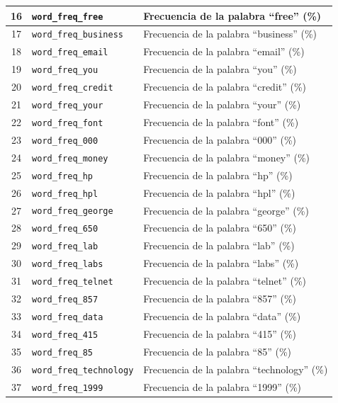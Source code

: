 \documentclass[a4paper,11pt ,openany]{book}
\begin{document}
\begin{longtable}{|c|l|l|}
16 & \texttt{word\_freq\_free} & Frecuencia de la palabra ``free'' (\%) \\ \hline
17 & \texttt{word\_freq\_business} & Frecuencia de la palabra ``business'' (\%) \\ \hline
18 & \texttt{word\_freq\_email} & Frecuencia de la palabra ``email'' (\%) \\ \hline
19 & \texttt{word\_freq\_you} & Frecuencia de la palabra ``you'' (\%) \\ \hline
20 & \texttt{word\_freq\_credit} & Frecuencia de la palabra ``credit'' (\%) \\ \hline
21 & \texttt{word\_freq\_your} & Frecuencia de la palabra ``your'' (\%) \\ \hline
22 & \texttt{word\_freq\_font} & Frecuencia de la palabra ``font'' (\%) \\ \hline
23 & \texttt{word\_freq\_000} & Frecuencia de la palabra ``000'' (\%) \\ \hline
24 & \texttt{word\_freq\_money} & Frecuencia de la palabra ``money'' (\%) \\ \hline
25 & \texttt{word\_freq\_hp} & Frecuencia de la palabra ``hp'' (\%) \\ \hline
26 & \texttt{word\_freq\_hpl} & Frecuencia de la palabra ``hpl'' (\%) \\ \hline
27 & \texttt{word\_freq\_george} & Frecuencia de la palabra ``george'' (\%) \\ \hline
28 & \texttt{word\_freq\_650} & Frecuencia de la palabra ``650'' (\%) \\ \hline
29 & \texttt{word\_freq\_lab} & Frecuencia de la palabra ``lab'' (\%) \\ \hline
30 & \texttt{word\_freq\_labs} & Frecuencia de la palabra ``labs'' (\%) \\ \hline
31 & \texttt{word\_freq\_telnet} & Frecuencia de la palabra ``telnet'' (\%) \\ \hline
32 & \texttt{word\_freq\_857} & Frecuencia de la palabra ``857'' (\%) \\ \hline
33 & \texttt{word\_freq\_data} & Frecuencia de la palabra ``data'' (\%) \\ \hline
34 & \texttt{word\_freq\_415} & Frecuencia de la palabra ``415'' (\%) \\ \hline
35 & \texttt{word\_freq\_85} & Frecuencia de la palabra ``85'' (\%) \\ \hline
36 & \texttt{word\_freq\_technology} & Frecuencia de la palabra ``technology'' (\%) \\ \hline
37 & \texttt{word\_freq\_1999} & Frecuencia de la palabra ``1999'' (\%) \\ \hline

\end{longtable}
\end{document}

